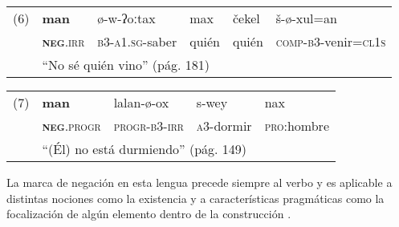 {%
\noindent \begin{tabular}{llllll}
(6) & \textbf{man} & ø-w-ʔoːtax & max & čekel & š-ø-xul=an \\
& \textsc{\textbf{neg}.irr} & \textsc{b3-a1.sg}-saber & quién & quién & \textsc{comp-b3}-venir=\textsc{cl1s} \\
& \multicolumn{5}{l}{“No sé quién vino” (pág. 181)}                       
\end{tabular} \vspace{0.20cm}

\noindent \begin{tabular}{lllll}
(7) & \textbf{man} & lalan-ø-ox & s-wey & nax \\
& \textsc{\textbf{neg}.progr} & \textsc{progr-b3-irr} & \textsc{a3}-dormir & \textsc{pro}:hombre \\
& \multicolumn{4}{l}{“(Él) no está durmiendo” (pág. 149)}        
\end{tabular} \vspace{0.25cm}

}

La marca de negación en esta lengua precede siempre al verbo y es aplicable a distintas nociones como la existencia y a características pragmáticas como la focalización de algún elemento dentro de la construcción \textcolor{MidnightBlue}{\citep{acateco}}.